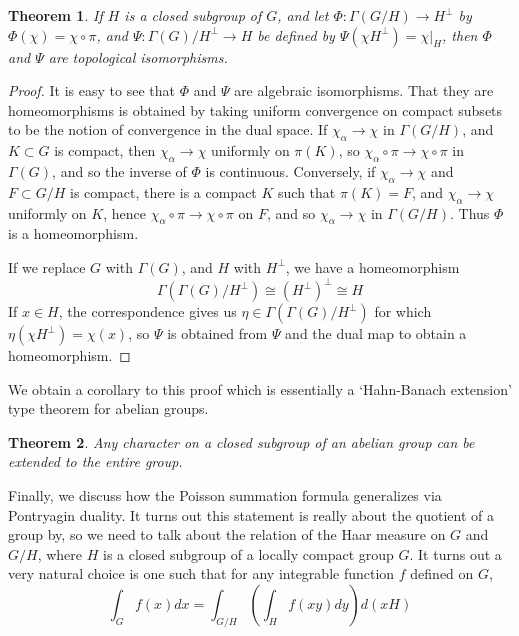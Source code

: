 \documentclass{article}
\theoremstyle{plain}
\newtheorem{theorem}{Theorem}
\theoremstyle{definition}
\begin{document}
\begin{theorem}
    If $H$ is a closed subgroup of $G$, and let $\Phi: \Gamma(G/H) \to H^\perp$ by $\Phi(\chi) = \chi \circ \pi$, and $\Psi:\Gamma(G)/H^\perp \to H$ be defined by $\Psi(\chi H^\perp) = \chi|_H$, then $\Phi$ and $\Psi$ are topological isomorphisms.
\end{theorem}
\begin{proof}
    It is easy to see that $\Phi$ and $\Psi$ are algebraic isomorphisms. That they are homeomorphisms is obtained by taking uniform convergence on compact subsets to be the notion of convergence in the dual space. If $\chi_\alpha \to \chi$ in $\Gamma(G/H)$, and $K \subset G$ is compact, then $\chi_\alpha \to \chi$ uniformly on $\pi(K)$, so $\chi_\alpha \circ \pi \to \chi \circ \pi$ in $\Gamma(G)$, and so the inverse of $\Phi$ is continuous. Conversely, if $\chi_\alpha \to \chi$ and $F \subset G/H$ is compact, there is a compact $K$ such that $\pi(K) = F$, and $\chi_\alpha \to \chi$ uniformly on $K$, hence $\chi_\alpha \circ \pi \to \chi \circ \pi$ on $F$, and so $\chi_\alpha \to \chi$ in $\Gamma(G/H)$. Thus $\Phi$ is a homeomorphism.

    If we replace $G$ with $\Gamma(G)$, and $H$ with $H^\perp$, we have a homeomorphism
    \[ \Gamma(\Gamma(G)/H^\perp) \cong (H^\perp)^\perp \cong H \]
    If $x \in H$, the correspondence gives us $\eta \in \Gamma(\Gamma(G)/H^\perp)$ for which $\eta(\chi H^\perp) = \chi(x)$, so $\Psi$ is obtained from $\Psi$ and the dual map to obtain a homeomorphism.
\end{proof}

We obtain a corollary to this proof which is essentially a `Hahn-Banach extension' type theorem for abelian groups.

\begin{theorem}
    Any character on a closed subgroup of an abelian group can be extended to the entire group.
\end{theorem}

Finally, we discuss how the Poisson summation formula generalizes via Pontryagin duality. It turns out this statement is really about the quotient of a group by, so we need to talk about the relation of the Haar measure on $G$ and $G/H$, where $H$ is a closed subgroup of a locally compact group $G$. It turns out a very natural choice is one such that for any integrable function $f$ defined on $G$,
%
\[ \int_G f(x) dx = \int_{G/H} \left( \int_H f(xy) dy \right) d(xH) \]
\end{document}

